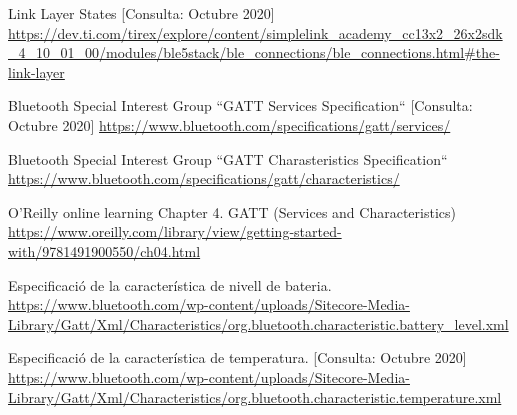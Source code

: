 \begin{thebibliography}{2}
Link Layer States [Consulta: Octubre 2020]\newline
\href{https://dev.ti.com/tirex/explore/content/simplelink_academy_cc13x2_26x2sdk_4_10_01_00/modules/ble5stack/ble_connections/ble_connections.html\#the-link-layer}{https://dev.ti.com/tirex/explore/content/simplelink\_academy\_cc13x2\_26x2sdk\_4\_10\_01\_00/modules/ble5stack/ble\_connections/ble\_connections.html\#the-link-layer}

Bluetooth Special Interest Group
``GATT Services Specification``
[Consulta: Octubre 2020]\newline
\href{https://www.bluetooth.com/specifications/gatt/services/}{https://www.bluetooth.com/specifications/gatt/services/}

Bluetooth Special Interest Group ``GATT Charasteristics Specification``\newline
\href{https://www.bluetooth.com/specifications/gatt/characteristics/}{https://www.bluetooth.com/specifications/gatt/characteristics/}

O’Reilly online learning
Chapter 4. GATT (Services and Characteristics)  \newline
\href{https://www.oreilly.com/library/view/getting-started-with/9781491900550/ch04.html}{https://www.oreilly.com/library/view/getting-started-with/9781491900550/ch04.html}

Especificació de la característica de nivell de bateria.\newline
\href{https://www.bluetooth.com/wp-content/uploads/Sitecore-Media-Library/Gatt/Xml/Characteristics/org.bluetooth.characteristic.battery\_level.xml}{https://www.bluetooth.com/wp-content/uploads/Sitecore-Media-Library/Gatt/Xml/Characteristics/org.bluetooth.characteristic.battery\_level.xml}

Especificació de la característica de temperatura.
[Consulta: Octubre 2020] \newline
\href{https://www.bluetooth.com/wp-content/uploads/Sitecore-Media-Library/Gatt/Xml/Characteristics/org.bluetooth.characteristic.temperature.xml}{https://www.bluetooth.com/wp-content/uploads/Sitecore-Media-Library/Gatt/Xml/Characteristics/org.bluetooth.characteristic.temperature.xml}


\end{thebibliography}
